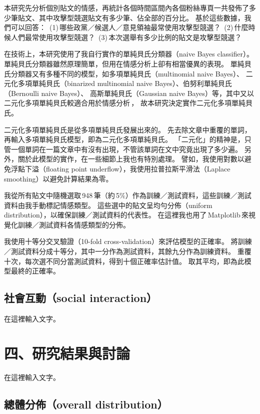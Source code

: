 \documentclass[letterpaper, 10pt, conference]{ieeeconf}   %
\begin{document}
\begin{CJK}{UTF8}{bsmi}
本研究先分析個別貼文的情感，再統計各個時間區間內各個粉絲專頁一共發佈了多少筆貼文、其中攻擊型競選貼文有多少筆、佔全部的百分比。
基於這些數據，我們可以回答：
\,(1)\,哪些政黨／候選人／意見領袖最常使用攻擊型競選？
\,(2)\,什麼時候人們最常使用攻擊型競選？
\,(3)\,本次選舉有多少比例的貼文是攻擊型競選？

在技術上，本研究使用了我自行實作的單純貝氏分類器（naive Bayes classifier）\cite{c13}。
單純貝氏分類器雖然原理簡單，但用在情感分析上卻有相當優異的表現。
單純貝氏分類器又有多種不同的模型，如多項單純貝氏（multinomial naive Bayes）、
二元化多項單純貝氏（binarized multinomial naive Bayes）、伯努利單純貝氏（Bernoulli naive Bayes）、
高斯單純貝氏（Gaussian naive Bayes）等，其中又以二元化多項單純貝氏較適合用於情感分析\,\cite{c14}，
故本研究決定實作二元化多項單純貝氏。

二元化多項單純貝氏是從多項單純貝氏發展出來的。
先去除文章中重覆的單詞，再輸入多項單純貝氏模型，即為二元化多項單純貝氏。
「二元化」的精神是，只管一個單詞在一篇文章中有沒有出現，不管該單詞在文中究竟出現了多少遍。
另外，關於此模型的實作，在一些細節上我也有特別處理。
譬如，我使用對數以避免浮點下溢（floating point underflow），我使用拉普拉斯平滑法（Laplace smoothing）以避免計算結果為零。

我從所有貼文中隨機選取\,948\,筆（約\,5\%）作為訓練／測試資料，這些訓練／測試資料由我手動標記情感類型。
這些選中的貼文呈均勻分佈（uniform distribution），以確保訓練／測試資料的代表性。
在這裡我也用了\,Matplotlib\,來視覺化訓練／測試資料各情感類型的分佈。

我使用十等分交叉驗證（10-fold cross-validation）來評估模型的正確率。
將訓練／測試資料分成十等分，其中一分作為測試資料，其餘九分作為訓練資料。
重覆十次，每次選不同分當測試資料，得到十個正確率估計值。
取其平均，即為此模型最終的正確率。

\subsection*{社會互動（social interaction）}

在這裡輸入文字。

\section*{四、研究結果與討論}

在這裡輸入文字。

\subsection*{總體分佈（overall distribution）}


\end{CJK}
\end{document}
